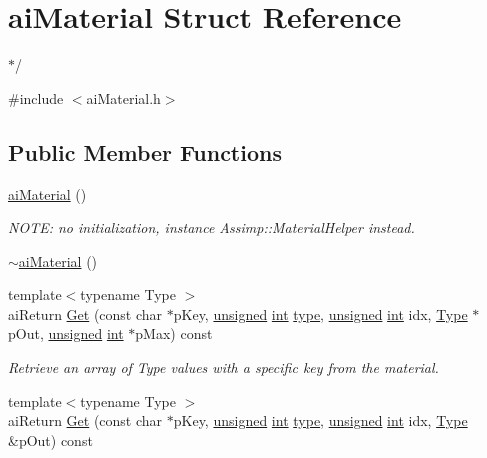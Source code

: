 \hypertarget{structai_material}{\section{ai\-Material Struct Reference}
\label{structai_material}
}


$\ast$/  




{\ttfamily \#include $<$ai\-Material.\-h$>$}

\subsection*{Public Member Functions}
\begin{DoxyCompactItemize}
\item 
\hyperlink{structai_material_a3c350f89834a7cd3dbc4b4490a0a09dd}{ai\-Material} ()
\begin{DoxyCompactList}\small\item\em N\-O\-T\-E\-: no initialization, instance Assimp\-::\-Material\-Helper instead. \end{DoxyCompactList}\item 
\hyperlink{structai_material_a9c4c1c8fd7580777ffffe96b63d4b3f7}{$\sim$ai\-Material} ()
\item 
{\footnotesize template$<$typename Type $>$ }\\ai\-Return \hyperlink{structai_material_ace8dbb50ac9e239eca08292c7c961057}{Get} (const char $\ast$p\-Key, \hyperlink{_free_image_8h_a425076c7067a1b5166e2cc530e914814}{unsigned} \hyperlink{wglew_8h_a500a82aecba06f4550f6849b8099ca21}{int} \hyperlink{fmod_8h_a5338b9cb3874378d7e5adfbe80a8a381}{type}, \hyperlink{_free_image_8h_a425076c7067a1b5166e2cc530e914814}{unsigned} \hyperlink{wglew_8h_a500a82aecba06f4550f6849b8099ca21}{int} idx, \hyperlink{group___i_n_f2990-04_ga1d1cfd8ffb84e947f82999c682b666a7}{Type} $\ast$p\-Out, \hyperlink{_free_image_8h_a425076c7067a1b5166e2cc530e914814}{unsigned} \hyperlink{wglew_8h_a500a82aecba06f4550f6849b8099ca21}{int} $\ast$p\-Max) const 
\begin{DoxyCompactList}\small\item\em Retrieve an array of Type values with a specific key from the material. \end{DoxyCompactList}\item 
{\footnotesize template$<$typename Type $>$ }\\ai\-Return \hyperlink{structai_material_a6813bb11ee8d1de9d1d99a60cdb304d3}{Get} (const char $\ast$p\-Key, \hyperlink{_free_image_8h_a425076c7067a1b5166e2cc530e914814}{unsigned} \hyperlink{wglew_8h_a500a82aecba06f4550f6849b8099ca21}{int} \hyperlink{fmod_8h_a5338b9cb3874378d7e5adfbe80a8a381}{type}, \hyperlink{_free_image_8h_a425076c7067a1b5166e2cc530e914814}{unsigned} \hyperlink{wglew_8h_a500a82aecba06f4550f6849b8099ca21}{int} idx, \hyperlink{group___i_n_f2990-04_ga1d1cfd8ffb84e947f82999c682b666a7}{Type} \&p\-Out) const 

\end{DoxyCompactItemize}
